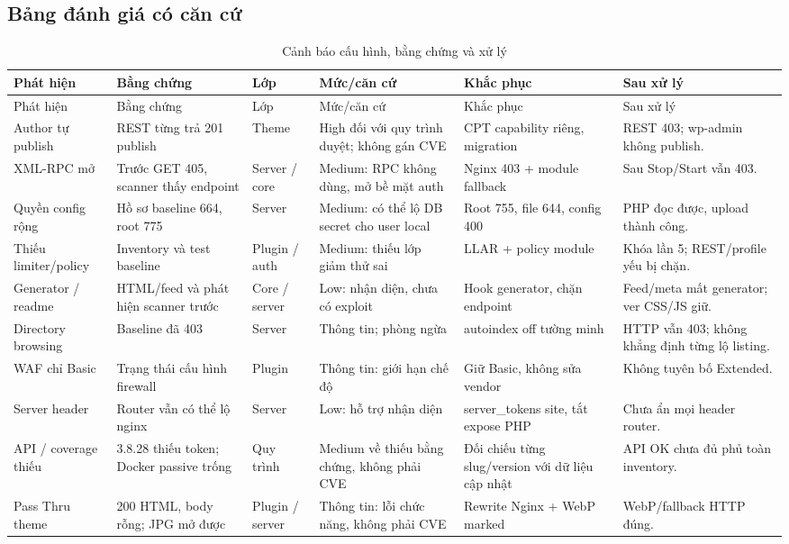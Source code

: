 \subsection{Bảng đánh giá có căn cứ}
\begingroup\small\setlength{\tabcolsep}{3pt}
\begin{longtable}{P{2.4cm}P{3.2cm}P{1.4cm}P{2.3cm}P{2.7cm}P{2.6cm}}
\caption{Cảnh báo cấu hình, bằng chứng và xử lý}\label{tab:assessment}\\\toprule Phát hiện & Bằng chứng & Lớp & Mức/căn cứ & Khắc phục & Sau xử lý\\\midrule\endfirsthead\toprule Phát hiện & Bằng chứng & Lớp & Mức/căn cứ & Khắc phục & Sau xử lý\\\midrule\endhead
Author tự publish & REST từng trả 201 publish & Theme & High đối với quy trình duyệt; không gán CVE & CPT capability riêng, migration & REST 403; wp-admin không publish.\\
XML-RPC mở & Trước GET 405, scanner thấy endpoint & Server / core & Medium: RPC không dùng, mở bề mặt auth & Nginx 403 + module fallback & Sau Stop/Start vẫn 403.\\
Quyền config rộng & Hồ sơ baseline 664, root 775 & Server & Medium: có thể lộ DB secret cho user local & Root 755, file 644, config 400 & PHP đọc được, upload thành công.\\
Thiếu limiter/policy & Inventory và test baseline & Plugin / auth & Medium: thiếu lớp giảm thử sai & LLAR + policy module & Khóa lần 5; REST/profile yếu bị chặn.\\
Generator / readme & HTML/feed và phát hiện scanner trước & Core / server & Low: nhận diện, chưa có exploit & Hook generator, chặn endpoint & Feed/meta mất generator; ver CSS/JS giữ.\\
Directory browsing & Baseline đã 403 & Server & Thông tin; phòng ngừa & autoindex off tường minh & HTTP vẫn 403; không khẳng định từng lộ listing.\\
WAF chỉ Basic & Trạng thái cấu hình firewall & Plugin & Thông tin: giới hạn chế độ & Giữ Basic, không sửa vendor & Không tuyên bố Extended.\\
Server header & Router vẫn có thể lộ nginx & Server & Low: hỗ trợ nhận diện & server\_tokens site, tắt expose PHP & Chưa ẩn mọi header router.\\
API / coverage thiếu & 3.8.28 thiếu token; Docker passive trống & Quy trình & Medium về thiếu bằng chứng, không phải CVE & Đối chiếu từng slug/version với dữ liệu cập nhật & API OK chưa đủ phủ toàn inventory.\\
Pass Thru theme & 200 HTML, body rỗng; JPG mở được & Plugin / server & Thông tin: lỗi chức năng, không phải CVE & Rewrite Nginx + WebP marked & WebP/fallback HTTP đúng.\\\bottomrule
\end{longtable}\endgroup

